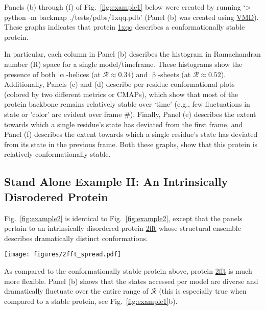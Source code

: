 \documentclass[fleqn,10pt,lineno]{wlpeerj} %
\newcommand{\Fig}[1]{Fig.~\ref{#1}}
\begin{document}
Panels (b) through (f) of \Fig{fig:example1} below were created by running `> python -m backmap ./tests/pdbs/1xqq.pdb' (Panel (b) was created using \href{http://www.ks.uiuc.edu/Research/vmd/}{VMD}). These graphs indicates that protein \href{https://www.rcsb.org/structure/1XQQ}{1xqq} describes a conformationally stable protein. 

In particular, each column in Panel (b) describes the histogram in Ramachandran number (R) space for a single model/timeframe. These histograms show the presence of both $\upalpha$-helices (at $\mathcal{R} \approx 0.34$) and $\upbeta$-sheets (at $\mathcal{R} \approx 0.52$). Additionally, Panels (c) and (d) describe per-residue conformational plots (colored by two different metrics or CMAPs), which show that most of the protein backbone remains relatively stable over `time' (e.g., few fluctuations in state or 'color' are evident over frame \#). Finally, Panel (e) describes the extent towards which a single residue's state has deviated from the first frame, and Panel (f) describes the extent towards which a single residue's state has deviated from its state in the previous frame. Both these graphs, show that this protein is relatively conformationally stable.

\subsection*{Stand Alone Example II: An Intrinsically Disrodered Protein}

\Fig{fig:example2} is identical to \Fig{fig:example2}, except that the panels pertain to an intrinsically disordered protein \href{https://www.rcsb.org/structure/2FFT}{2fft} whose structural ensemble describes dramatically distinct conformations. 

\begin{figure*}[t!]
\texttt{[image: figures/2fft\_spread.pdf]}
\caption{Protein \href{https://www.rcsb.org/structure/2FFT}{2fft} describes an intrinsically disordered protein.\label{fig:example2}} 
\end{figure*}

As compared to the conformationally stable protein above, protein \href{https://www.rcsb.org/structure/2FFT}{2fft} is much more flexible. Panel (b) shows that the states accessed per model are diverse and dramatically fluctuate over the entire range of $\mathcal{R}$ (this is especially true when compared to a stable protein, see \Fig{fig:example1}b). 
\end{document}
